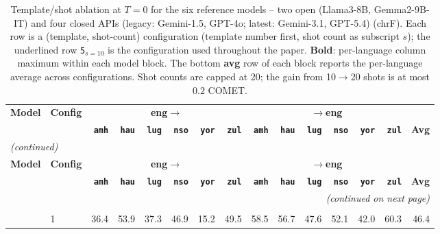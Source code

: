 \begingroup
\footnotesize
\setlength{\tabcolsep}{4pt}
\renewcommand{\arraystretch}{1.05}
\begin{longtable}{llrrrrrrrrrrrrr}
\toprule
\textbf{Model} & \textbf{Config} & \multicolumn{6}{c}{\textbf{eng$\to$}} & \multicolumn{6}{c}{\textbf{$\to$eng}} & \\
\cmidrule(lr){3-8}\cmidrule(lr){9-14}
  &   & \textbf{\texttt{amh}} & \textbf{\texttt{hau}} & \textbf{\texttt{lug}} & \textbf{\texttt{nso}} & \textbf{\texttt{yor}} & \textbf{\texttt{zul}} & \textbf{\texttt{amh}} & \textbf{\texttt{hau}} & \textbf{\texttt{lug}} & \textbf{\texttt{nso}} & \textbf{\texttt{yor}} & \textbf{\texttt{zul}} & \textbf{Avg} \\
\midrule
\endfirsthead
\multicolumn{15}{l}{\textit{(continued)}} \\
\toprule
\textbf{Model} & \textbf{Config} & \multicolumn{6}{c}{\textbf{eng$\to$}} & \multicolumn{6}{c}{\textbf{$\to$eng}} & \\
\cmidrule(lr){3-8}\cmidrule(lr){9-14}
  &   & \textbf{\texttt{amh}} & \textbf{\texttt{hau}} & \textbf{\texttt{lug}} & \textbf{\texttt{nso}} & \textbf{\texttt{yor}} & \textbf{\texttt{zul}} & \textbf{\texttt{amh}} & \textbf{\texttt{hau}} & \textbf{\texttt{lug}} & \textbf{\texttt{nso}} & \textbf{\texttt{yor}} & \textbf{\texttt{zul}} & \textbf{Avg} \\
\midrule
\endhead
\midrule
\multicolumn{15}{r}{\textit{(continued on next page)}} \\
\endfoot
\bottomrule
\caption{Template/shot ablation at $T{=}0$ for the six reference models -- two open (Llama3-8B, Gemma2-9B-IT) and four closed APIs (legacy: Gemini-1.5, GPT-4o; latest: Gemini-3.1, GPT-5.4) (chrF). Each row is a (template, shot-count) configuration (template number first, shot count as subscript $s$); the underlined row \texttt{5}$_{s=10}$ is the configuration used throughout the paper. \textbf{Bold}: per-language column maximum within each model block. The bottom \textbf{avg} row of each block reports the per-language average across configurations. Shot counts are capped at 20; the gain from 10$\to$20 shots is at most $0.2$ COMET.} \label{tab:template_shot_ablation_chrf} \\
\endlastfoot
\multirow{10}{*}{\rotatebox{90}{Gemini-1.5}} & 1 & 36.4 & 53.9 & 37.3 & 46.9 & 15.2 & 49.5 & 58.5 & 56.7 & 47.6 & 52.1 & 42.0 & 60.3 & 46.4 \\

\end{longtable}
